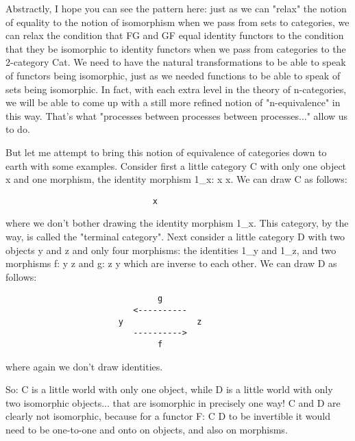 Abstractly, I hope you can see the pattern here: just as we can "relax"
the notion of equality to the notion of isomorphism when we pass from
sets to categories, we can relax the condition that FG and GF equal
identity functors to the condition that they be isomorphic to identity
functors when we pass from categories to the 2-category Cat.  We need to
have the natural transformations to be able to speak of functors being
isomorphic, just as we needed functions to be able to speak of sets
being isomorphic.   In fact, with each extra level in the theory of
n-categories, we will be able to come up with a still more refined
notion of "n-equivalence" in this way.  That's what "processes between
processes between processes..." allow us to do.

But let me attempt to bring this notion of equivalence of categories
down to earth with some examples.  Consider first a little category
C with only one object x and one morphism, the identity morphism 
1_{x}: x \to  x.  We can draw C as follows:

\begin{verbatim}
                              x

\end{verbatim}
    
where we don't bother drawing the identity morphism 1_{x}.  This
category, by the way, is called the "terminal category".  Next
consider a little category D with two objects y and z and only four
morphisms: the identities 1_{y} and 1_{z}, and 
two morphisms f: y \to  z
and g: z \to  y which are inverse to each other.  We can draw D as
follows:
     
\begin{verbatim}
                               g
                          <----------
                       y               z
                          ---------->
                               f

\end{verbatim}
    
where again we don't draw identities.  

So: C is a little world with only one object, while D is a little world
with only two isomorphic objects... that are isomorphic in precisely one
way!  C and D are clearly not isomorphic, because for a functor F: C \to 
D to be invertible it would need to be one-to-one and onto on objects,
and also on morphisms. 


